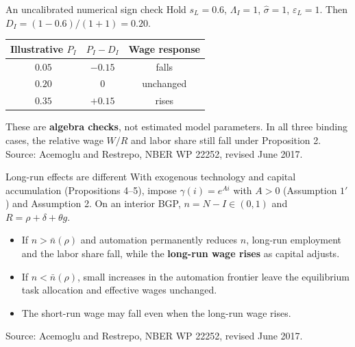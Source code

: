 \documentclass[aspectratio=169,11pt]{beamer}
\newcommand{\key}[1]{{\color{accent}\bfseries #1}}
\newcommand{\sourcefoot}{\vfill{\color{muted}\scriptsize Source: Acemoglu and Restrepo, NBER WP 22252, revised June 2017.}}
\begin{document}
\begin{frame}{An uncalibrated numerical sign check}
\small Hold $s_L=0.6$, $\Lambda_I=1$, $\widehat\sigma=1$, $\varepsilon_L=1$. Then $D_I=(1-0.6)/(1+1)=0.20$.
\vspace{0.7em}
\begin{center}
\begin{tabular}{ccc}
\toprule
Illustrative $P_I$ & $P_I-D_I$ & Wage response \\
\midrule
$0.05$ & $-0.15$ & falls \\
$0.20$ & $0$ & unchanged \\
$0.35$ & $+0.15$ & rises \\
\bottomrule
\end{tabular}
\end{center}
\vspace{0.5em}
These are \key{algebra checks}, not estimated model parameters. In all three binding cases, the relative wage $W/R$ and labor share still fall under Proposition 2.
\sourcefoot
\end{frame}

\begin{frame}{Long-run effects are different}
\small With exogenous technology and capital accumulation (Propositions 4--5), impose $\gamma(i)=e^{Ai}$ with $A>0$ (Assumption $1'$) and Assumption 2. On an interior BGP, $n=N-I\in(0,1)$ and $R=\rho+\delta+\theta g$.
\vspace{0.5em}
\begin{itemize}\setlength\itemsep{0.55em}
\item If $n>\bar n(\rho)$ and automation permanently reduces $n$, long-run employment and the labor share fall, while the \key{long-run wage rises} as capital adjusts.
\item If $n<\bar n(\rho)$, small increases in the automation frontier leave the equilibrium task allocation and effective wages unchanged.
\item The short-run wage may fall even when the long-run wage rises.
\end{itemize}
\sourcefoot
\end{frame}
\end{document}
